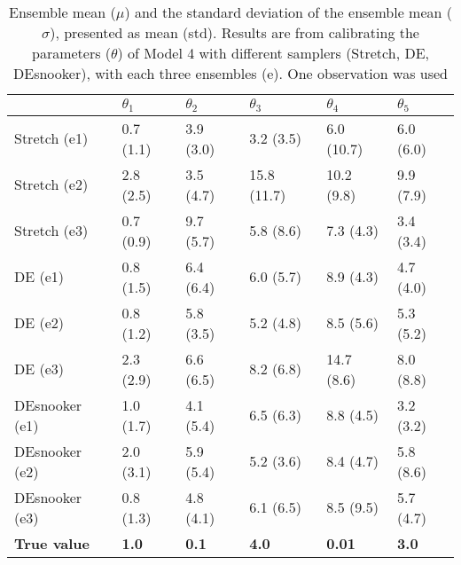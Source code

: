 \begin{table}[ht]
\caption{Ensemble mean ($\mu$) and the standard deviation of the ensemble mean ($\sigma$), presented as mean (std). Results are from calibrating the parameters ($\theta$) of Model 4 with different samplers (Stretch, DE, DEsnooker), with each three ensembles (e). One observation was used}
\label{tab_logbook8_obs1_model4}
\begin{tabularx}{\textwidth}{lXXXXX}
\toprule
 & $\theta_1$ & $\theta_2$ & $\theta_3$ & $\theta_4$ & $\theta_5$ \\
\midrule
Stretch (e1) & 0.7 (1.1) & 3.9 (3.0) & 3.2 (3.5) & 6.0 (10.7) & 6.0 (6.0) \\
Stretch (e2) & 2.8 (2.5) & 3.5 (4.7) & 15.8 (11.7) & 10.2 (9.8) & 9.9 (7.9) \\
Stretch (e3) & 0.7 (0.9) & 9.7 (5.7) & 5.8 (8.6) & 7.3 (4.3) & 3.4 (3.4) \\
\midrule
DE (e1) & 0.8 (1.5) & 6.4 (6.4) & 6.0 (5.7) & 8.9 (4.3) & 4.7 (4.0) \\
DE (e2) & 0.8 (1.2) & 5.8 (3.5) & 5.2 (4.8) & 8.5 (5.6) & 5.3 (5.2) \\
DE (e3) & 2.3 (2.9) & 6.6 (6.5) & 8.2 (6.8) & 14.7 (8.6) & 8.0 (8.8) \\
\midrule
DEsnooker (e1) & 1.0 (1.7) & 4.1 (5.4) & 6.5 (6.3) & 8.8 (4.5) & 3.2 (3.2) \\
DEsnooker (e2) & 2.0 (3.1) & 5.9 (5.4) & 5.2 (3.6) & 8.4 (4.7) & 5.8 (8.6) \\
DEsnooker (e3) & 0.8 (1.3) & 4.8 (4.1) & 6.1 (6.5) & 8.5 (9.5) & 5.7 (4.7) \\
\midrule
\textbf{True value} & \textbf{1.0} & \textbf{0.1} &\textbf{4.0} & \textbf{0.01} &\textbf{3.0} \\
\bottomrule
\end{tabularx}
\end{table}

